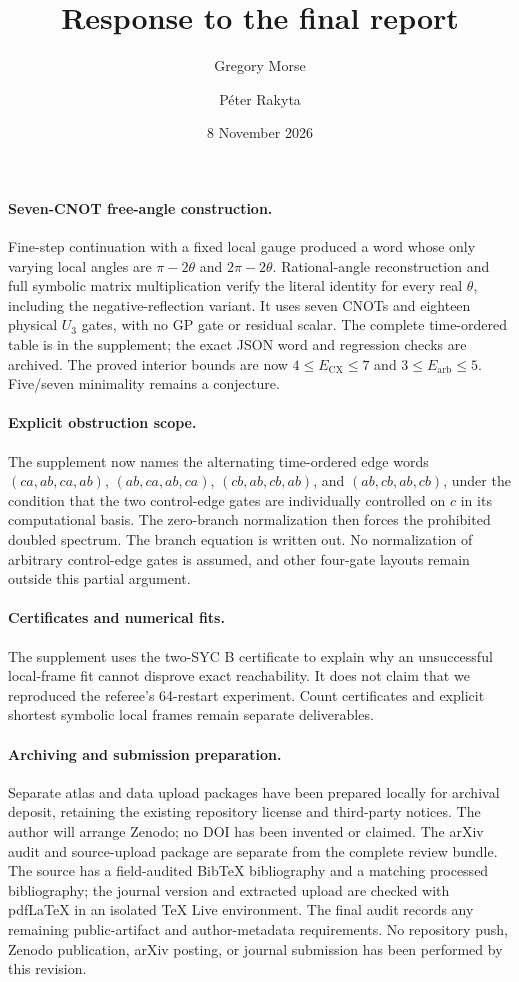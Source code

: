 \documentclass[11pt]{article}
\title{Response to the final report}
\author{Gregory Morse \and P\'eter Rakyta}\date{8 November 2026}
\begin{document}
\maketitle
\paragraph{Seven-CNOT free-angle construction.}
Fine-step continuation with a fixed local gauge produced a word whose only
varying local angles are $\pi-2\theta$ and $2\pi-2\theta$. Rational-angle
reconstruction and full symbolic matrix multiplication verify the literal
identity for every real $\theta$, including the negative-reflection variant.
It uses seven CNOTs and eighteen physical $U_3$ gates, with no GP gate or
residual scalar. The complete time-ordered table is in the supplement;
the exact JSON word and regression checks are archived. The proved interior
bounds are now $4\le E_{\mathrm{CX}}\le7$ and
$3\le E_{\mathrm{arb}}\le5$. Five/seven minimality remains a conjecture.

\paragraph{Explicit obstruction scope.}
The supplement now names the alternating time-ordered edge words
$(ca,ab,ca,ab)$, $(ab,ca,ab,ca)$, $(cb,ab,cb,ab)$, and $(ab,cb,ab,cb)$,
under the condition that the two control-edge gates are individually
controlled on $c$ in its computational basis. The zero-branch normalization
then forces the prohibited doubled spectrum. The branch equation is written
out. No normalization of arbitrary control-edge gates is assumed, and
other four-gate layouts remain outside this partial argument.

\paragraph{Certificates and numerical fits.}
The supplement uses the two-SYC B certificate to explain why an unsuccessful
local-frame fit cannot disprove exact reachability. It does not claim that
we reproduced the referee's 64-restart experiment. Count certificates and
explicit shortest symbolic local frames remain separate deliverables.

\paragraph{Archiving and submission preparation.}
Separate atlas and data upload packages have been prepared locally for
archival deposit, retaining the existing repository license and third-party
notices. The author will arrange Zenodo; no DOI has been invented or claimed.
The arXiv audit and source-upload package are separate from the complete
review bundle. The source has a field-audited BibTeX bibliography and a
matching processed bibliography; the journal version and extracted upload
are checked with pdfLaTeX in an isolated TeX Live environment. The final
audit records any remaining public-artifact and author-metadata requirements.
No repository push, Zenodo publication, arXiv posting, or journal submission
has been performed by this revision.
\end{document}
